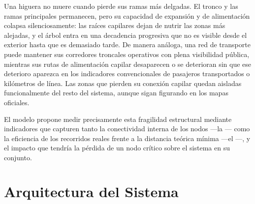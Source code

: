 
Una higuera no muere cuando pierde sus ramas más delgadas. El tronco y las ramas
principales permanecen, pero su capacidad de expansión y de alimentación colapsa
silenciosamente: las raíces capilares dejan de nutrir las zonas más alejadas, y
el árbol entra en una decadencia progresiva que no es visible desde el exterior
hasta que es demasiado tarde. De manera análoga, una red de transporte puede
mantener sus corredores troncales operativos con plena visibilidad pública,
mientras sus rutas de alimentación capilar desaparecen o se deterioran sin que
ese deterioro aparezca en los indicadores convencionales de pasajeros
transportados o kilómetros de línea. Las zonas que pierden su conexión capilar
quedan aisladas funcionalmente del resto del sistema, aunque sigan figurando en
los mapas oficiales.

El modelo propone medir precisamente esta fragilidad estructural mediante
indicadores que capturen tanto la conectividad interna de los nodos —la
— como la eficiencia de los recorridos reales frente a
la distancia teórica mínima —el —, y el impacto
que tendría la pérdida de un nodo crítico sobre el sistema en su conjunto.

\section{Arquitectura del Sistema}
\label{sec:vft-arquitectura}

